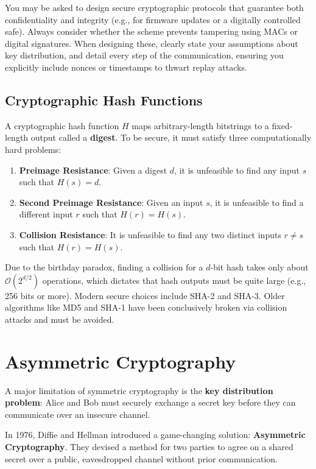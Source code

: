 \begin{tcolorbox}[colback=blue!5!white,colframe=blue!75!black,title=Exam Insight]
You may be asked to design secure cryptographic protocols that guarantee both confidentiality and integrity (e.g., for firmware updates or a digitally controlled safe). Always consider whether the scheme prevents tampering using MACs or digital signatures. When designing these, clearly state your assumptions about key distribution, and detail every step of the communication, ensuring you explicitly include nonces or timestamps to thwart replay attacks.
\end{tcolorbox}

\subsection{Cryptographic Hash Functions}
A cryptographic hash function $H$ maps arbitrary-length bitstrings to a fixed-length output called a \textbf{digest}. To be secure, it must satisfy three computationally hard problems:
\begin{enumerate}
    \item \textbf{Preimage Resistance}: Given a digest $d$, it is unfeasible to find any input $s$ such that $H(s) = d$.
    \item \textbf{Second Preimage Resistance}: Given an input $s$, it is unfeasible to find a different input $r$ such that $H(r) = H(s)$.
    \item \textbf{Collision Resistance}: It is unfeasible to find any two distinct inputs $r \neq s$ such that $H(r) = H(s)$.
\end{enumerate}
Due to the birthday paradox, finding a collision for a $d$-bit hash takes only about $\mathcal{O}(2^{d/2})$ operations, which dictates that hash outputs must be quite large (e.g., 256 bits or more). Modern secure choices include SHA-2 and SHA-3. Older algorithms like MD5 and SHA-1 have been conclusively broken via collision attacks and must be avoided.

\section{Asymmetric Cryptography}

A major limitation of symmetric cryptography is the \textbf{key distribution problem}: Alice and Bob must securely exchange a secret key before they can communicate over an insecure channel.

In 1976, Diffie and Hellman introduced a game-changing solution: \textbf{Asymmetric Cryptography}. They devised a method for two parties to agree on a shared secret over a public, eavesdropped channel without prior communication. 

